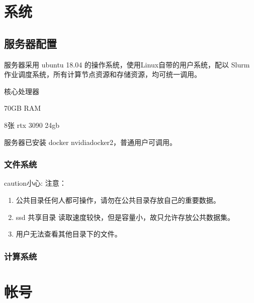 \documentclass[a4paper,12pt,english]{sphinxmanual}
\begin{document}
\chapter{系统}
\label{\detokenize{system/index:id1}}\label{\detokenize{system/index::doc}}

\section{服务器配置}
\label{\detokenize{system/index:id2}}
\sphinxAtStartPar
服务器采用 ubuntu 18.04 的操作系统，使用Linux自带的用户系统，配以 Slurm 作业调度系统，所有计算节点资源和存储资源，均可统一调用。

 核心处理器

\sphinxAtStartPar
70GB RAM

\sphinxAtStartPar
8张 rtx 3090 24gb

\sphinxAtStartPar
服务器已安装 docker nvidia\sphinxhyphen{}docker2，普通用户可调用。


\subsection{文件系统}
\label{\detokenize{system/filesystem:id1}}\label{\detokenize{system/filesystem::doc}}
\begin{sphinxadmonition}{caution}{小心:}
\sphinxAtStartPar
注意：
\begin{enumerate}
%
\item {} 
\sphinxAtStartPar
公共目录任何人都可操作，请勿在公共目录存放自己的重要数据。

\item {} 
\sphinxAtStartPar
ssd 共享目录 读取速度较快，但是容量小，故只允许存放公共数据集。

\item {} 
\sphinxAtStartPar
用户无法查看其他目录下的文件。

\end{enumerate}
\end{sphinxadmonition}

\noindent{}


\subsection{计算系统}
\label{\detokenize{system/computesystem:id1}}\label{\detokenize{system/computesystem::doc}}

\chapter{帐号}
\label{\detokenize{accounts/index:id1}}\label{\detokenize{accounts/index::doc}}
\end{document}
